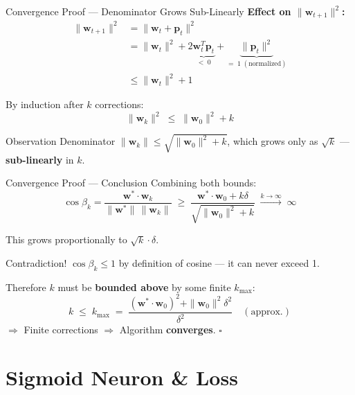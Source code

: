 \documentclass{beamer}
\begin{document}
\begin{frame}{Convergence Proof --- Denominator Grows Sub-Linearly}
  \textbf{Effect on $\|\mathbf{w}_{t+1}\|^2$:}
  \begin{align*}
    \|\mathbf{w}_{t+1}\|^2 &= \|\mathbf{w}_t + \mathbf{p}_t\|^2 \\
                             &= \|\mathbf{w}_t\|^2 + 2\underbrace{\mathbf{w}_t^T\mathbf{p}_t}_{<\;0}
                                + \underbrace{\|\mathbf{p}_t\|^2}_{=\;1\;(\text{normalized})} \\[4pt]
                             &\leq \|\mathbf{w}_t\|^2 + 1
  \end{align*}

  By induction after $k$ corrections:
  \[
    \boxed{\|\mathbf{w}_k\|^2 \;\leq\; \|\mathbf{w}_0\|^2 + k}
  \]

  \begin{block}{Observation}
    Denominator $\|\mathbf{w}_k\| \leq \sqrt{\|\mathbf{w}_0\|^2 + k}$, which grows only as
    $\sqrt{k}$ --- \textbf{sub-linearly} in $k$.
  \end{block}
\end{frame}

\begin{frame}{Convergence Proof --- Conclusion}
  Combining both bounds:
  \[
    \cos\beta_k
    = \frac{\mathbf{w}^*\cdot\mathbf{w}_k}{\|\mathbf{w}^*\|\,\|\mathbf{w}_k\|}
    \;\geq\;
    \frac{\mathbf{w}^*\cdot\mathbf{w}_0 + k\delta}{\sqrt{\|\mathbf{w}_0\|^2 + k}}
    \;\xrightarrow{k\to\infty}\; \infty
  \]

  This grows proportionally to $\sqrt{k}\cdot\delta$.

  \begin{alertblock}{Contradiction!}
    $\cos\beta_k \leq 1$ by definition of cosine --- it can never exceed 1.
  \end{alertblock}

  \begin{block}{Therefore}
    $k$ must be \textbf{bounded above} by some finite $k_{\max}$:
    \[
      k \;\leq\; k_{\max} \;=\; \frac{(\mathbf{w}^*\cdot\mathbf{w}_0)^2 + \|\mathbf{w}_0\|^2 \delta^2}{\delta^2}
      \quad (\text{approx.})
    \]
    $\Rightarrow$ Finite corrections $\Rightarrow$ Algorithm \textbf{converges}. \hfill $\square$
  \end{block}
\end{frame}

\section{Sigmoid Neuron \& Loss}
\end{document}

